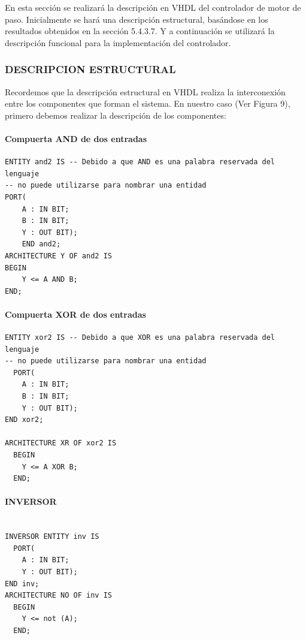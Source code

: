 En esta sección se realizará la descripción en VHDL del controlador de motor de paso. Inicialmente se hará una descripción estructural, basándose en los resultados obtenidos en la sección 5.4.3.7. Y a continuación se utilizará la descripción funcional para la implementación del controlador.

\subsubsection[DESCRIPCION ESTRUCTURAL]{DESCRIPCION ESTRUCTURAL}

Recordemos que la descripción estructural en VHDL realiza la interconexión entre los componentes que forman el sistema. En nuestro caso (Ver Figura 9), primero debemos realizar la descripción de los componentes:

\paragraph[Compuerta AND de dos entradas]{Compuerta AND de dos entradas}
\begin{lstlisting}
ENTITY and2 IS -- Debido a que AND es una palabra reservada del lenguaje
-- no puede utilizarse para nombrar una entidad
PORT(
    A : IN BIT;
    B : IN BIT;
    Y : OUT BIT);
    END and2;
ARCHITECTURE Y OF and2 IS
BEGIN
    Y <= A AND B;
END;
\end{lstlisting}

\paragraph[Compuerta XOR de dos entradas]{Compuerta XOR de dos entradas}
\begin{lstlisting}
ENTITY xor2 IS -- Debido a que XOR es una palabra reservada del lenguaje
-- no puede utilizarse para nombrar una entidad
  PORT(
    A : IN BIT;
    B : IN BIT;
    Y : OUT BIT); 
END xor2;

ARCHITECTURE XR OF xor2 IS
  BEGIN
    Y <= A XOR B;
  END;
\end{lstlisting}

\paragraph[INVERSOR]{ INVERSOR}
\begin{lstlisting}

INVERSOR ENTITY inv IS
  PORT(
    A : IN BIT;
    Y : OUT BIT); 
END inv;
ARCHITECTURE NO OF inv IS
  BEGIN
    Y <= not (A);
  END;
\end{lstlisting}


